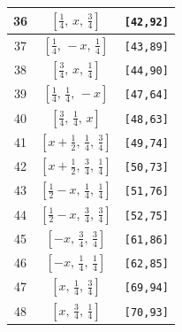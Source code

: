 \documentclass[fleqn,8pt]{jsarticle}
\begin{document}
\begin{longtable}{ccc}
36 & $\left[ \frac{1}{4},\, x,\, \frac{3}{4} \right]$ & {\tt [42,92]} \\ \hline
37 & $\left[ \frac{1}{4},\, - x,\, \frac{1}{4} \right]$ & {\tt [43,89]} \\ \hline
38 & $\left[ \frac{3}{4},\, x,\, \frac{1}{4} \right]$ & {\tt [44,90]} \\ \hline
39 & $\left[ \frac{1}{4},\, \frac{1}{4},\, - x \right]$ & {\tt [47,64]} \\ \hline
40 & $\left[ \frac{3}{4},\, \frac{1}{4},\, x \right]$ & {\tt [48,63]} \\ \hline
41 & $\left[ x + \frac{1}{2},\, \frac{1}{4},\, \frac{3}{4} \right]$ & {\tt [49,74]} \\ \hline
42 & $\left[ x + \frac{1}{2},\, \frac{3}{4},\, \frac{1}{4} \right]$ & {\tt [50,73]} \\ \hline
43 & $\left[ \frac{1}{2} - x,\, \frac{1}{4},\, \frac{1}{4} \right]$ & {\tt [51,76]} \\ \hline
44 & $\left[ \frac{1}{2} - x,\, \frac{3}{4},\, \frac{3}{4} \right]$ & {\tt [52,75]} \\ \hline
45 & $\left[ - x,\, \frac{3}{4},\, \frac{3}{4} \right]$ & {\tt [61,86]} \\ \hline
46 & $\left[ - x,\, \frac{1}{4},\, \frac{1}{4} \right]$ & {\tt [62,85]} \\ \hline
47 & $\left[ x,\, \frac{1}{4},\, \frac{3}{4} \right]$ & {\tt [69,94]} \\ \hline
48 & $\left[ x,\, \frac{3}{4},\, \frac{1}{4} \right]$ & {\tt [70,93]} \\
\end{longtable}
\renewcommand{\arraystretch}{1.2}
\end{document}
